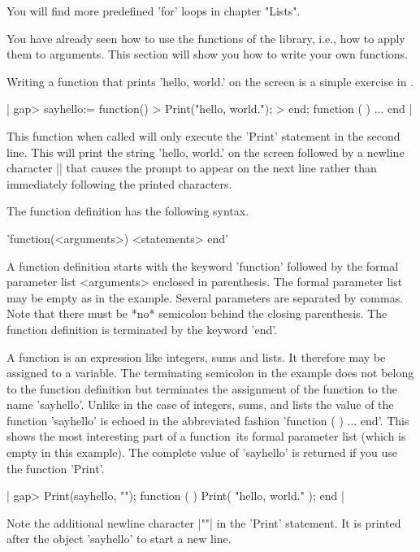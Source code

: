 You will find more predefined 'for' loops in chapter "Lists".


You  have  already seen how  to use the functions of the  {\GAP} library,
i.e., how to  apply them to arguments.  This section will show you how to
write your own functions.

Writing a function that prints 'hello, world.'  on the screen is a simple
exercise in {\GAP}.

|    gap> sayhello:= function()
    > Print("hello, world.\n");
    > end;
    function (  ) ... end |

This function when called will only execute the 'Print' statement in  the
second  line.  This will print the  string 'hello, world.' on the  screen
followed by a  newline character |\n| that  causes  the {\GAP}  prompt to
appear  on the next line  rather  than  immediately following the printed
characters.

The function definition has the following syntax.

'function(<arguments>) <statements> end'

A function definition starts with the keyword 'function' followed  by the
formal  parameter list <arguments> enclosed  in  parenthesis.  The formal
parameter list  may be empty as in  the example.  Several  parameters are
separated by commas.  Note that there  must be  *no* semicolon behind the
closing   parenthesis.   The  function  definition  is  terminated by the
keyword 'end'.

A {\GAP}  function is an expression  like integers,  sums and  lists.  It
therefore  may  be assigned to  a variable.  The terminating semicolon in
the example does not belong to the function definition but terminates the
assignment of the function to the name 'sayhello'.  Unlike in the case of
integers, sums, and lists  the value of the function 'sayhello' is echoed
in  the abbreviated fashion 'function ( ) ...  end'.  This shows the most
interesting  part of  a function\:\ its formal parameter list  (which  is
empty in this example).  The complete value of  'sayhello' is returned if
you use the function 'Print'.

|    gap> Print(sayhello, "\n");
    function (  )
        Print( "hello, world.\n" );
    end |

Note  the  additional newline character |"\n"| in  the 'Print' statement.
It is printed after the object 'sayhello' to start a new line.

